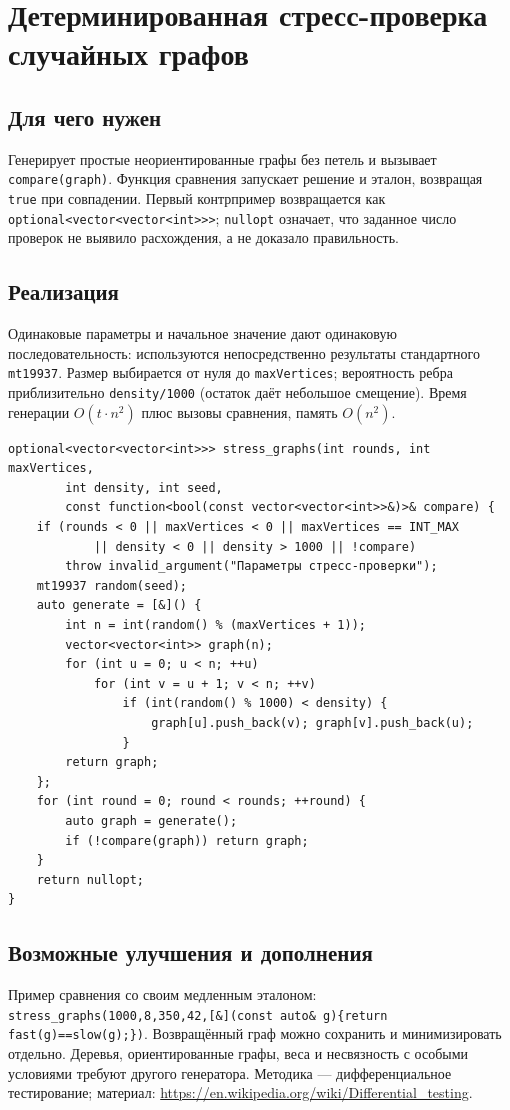\clearpage

\fi
\iffalse
\section{Детерминированная стресс-проверка случайных графов}
\subsection*{Для чего нужен}
Генерирует простые неориентированные графы без петель и вызывает
\texttt{compare(graph)}. Функция сравнения запускает решение и эталон,
возвращая \texttt{true} при совпадении. Первый контрпример возвращается
как \texttt{optional<vector<vector<int>>>}; \texttt{nullopt} означает,
что заданное число проверок не выявило расхождения, а не доказало правильность.
\subsection*{Реализация}
Одинаковые параметры и начальное значение дают одинаковую последовательность:
используются непосредственно результаты стандартного \texttt{mt19937}.
Размер выбирается от нуля до \texttt{maxVertices}; вероятность ребра
приблизительно \texttt{density/1000} (остаток даёт небольшое смещение).
Время генерации $O(t\cdot n^2)$ плюс вызовы сравнения, память $O(n^2)$.
\begin{lstlisting}[name=supplement_stress]
optional<vector<vector<int>>> stress_graphs(int rounds, int maxVertices,
        int density, int seed,
        const function<bool(const vector<vector<int>>&)>& compare) {
    if (rounds < 0 || maxVertices < 0 || maxVertices == INT_MAX
            || density < 0 || density > 1000 || !compare)
        throw invalid_argument("Параметры стресс-проверки");
    mt19937 random(seed);
    auto generate = [&]() {
        int n = int(random() % (maxVertices + 1));
        vector<vector<int>> graph(n);
        for (int u = 0; u < n; ++u)
            for (int v = u + 1; v < n; ++v)
                if (int(random() % 1000) < density) {
                    graph[u].push_back(v); graph[v].push_back(u);
                }
        return graph;
    };
    for (int round = 0; round < rounds; ++round) {
        auto graph = generate();
        if (!compare(graph)) return graph;
    }
    return nullopt;
}
\end{lstlisting}
\subsection*{Возможные улучшения и дополнения}
Пример сравнения со своим медленным эталоном:
\texttt{stress\_graphs(1000,8,350,42,[\&](const auto\& g)\{return fast(g)==slow(g);\})}.
Возвращённый граф можно сохранить и минимизировать отдельно. Деревья,
ориентированные графы, веса и несвязность с особыми условиями требуют
другого генератора. Методика --- дифференциальное тестирование;
материал: \url{https://en.wikipedia.org/wiki/Differential_testing}.

